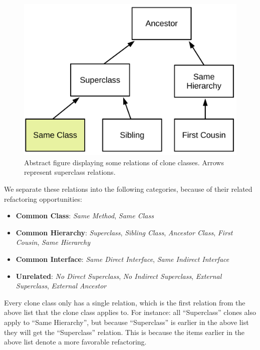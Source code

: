 \documentclass[runningheads]{llncs}
\begin{document}
\begin{figure}[H]
  \centering
    \includegraphics[width=0.6\columnwidth]{img/Relation}
      \caption{Abstract figure displaying some relations of clone classes. Arrows represent superclass relations.}
  \label{fig:clonerelation}
\end{figure}

We separate these relations into the following categories, because of their related refactoring opportunities:
\begin{itemize}
  \item \textbf{Common Class}: \textit{Same Method}, \textit{Same Class}
  \item \textbf{Common Hierarchy}: \textit{Superclass}, \textit{Sibling Class}, \textit{Ancestor Class}, \textit{First Cousin}, \textit{Same Hierarchy}
  \item \textbf{Common Interface}: \textit{Same Direct Interface}, \textit{Same Indirect Interface}
  \item \textbf{Unrelated}: \textit{No Direct Superclass}, \textit{No Indirect Superclass}, \textit{External Superclass}, \textit{External Ancestor}
\end{itemize}

Every clone class only has a single relation, which is the first relation from the above list that the clone class applies to. For instance: all ``Superclass'' clones also apply to ``Same Hierarchy'', but because ``Superclass'' is earlier in the above list they will get the ``Superclass'' relation. This is because the items earlier in the above list denote a more favorable refactoring.


\end{document}
